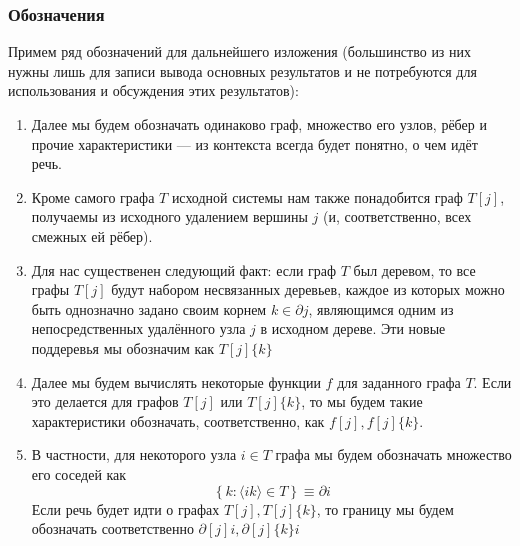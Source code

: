 \subsubsection{Обозначения}
Примем ряд обозначений для дальнейшего изложения (большинство из них нужны лишь для записи вывода основных результатов и не потребуются для использования и обсуждения этих результатов):
\begin{enumerate}
	\item Далее мы будем обозначать одинаково граф, множество его узлов, рёбер и прочие характеристики --- из контекста всегда будет понятно, о чем идёт речь. 
	
	\item Кроме самого графа $T$ исходной системы нам также понадобится граф $T[j]$, получаемы из исходного удалением вершины $j$ (и, соответственно, всех смежных ей рёбер).
	
	\item Для нас существенен следующий факт: если граф $T$ был деревом, то все графы $T[j]$ будут набором несвязанных деревьев, каждое из которых можно быть однозначно задано своим корнем $k \in \partial j$, являющимся одним из непосредственных удалённого узла $j$ в исходном дереве. Эти новые поддеревья мы обозначим как $T[j]\{k\}$
	
	\item Далее мы будем вычислять некоторые функции $f$ для заданного графа $T$. Если это делается для графов $T[j]$ или $T[j]\{k\}$, то мы будем такие характеристики обозначать, соответственно, как $f[j], f[j]\{k\}$.
	
	\item В частности, для некоторого узла $i \in T$ графа мы будем обозначать множество его соседей как
	$$
	\left\{ k : \langle ik \rangle \in T \right\} \equiv \partial i
	$$
	Если речь будет идти о графах $T[j],T[j]\{k\}$, то границу мы будем обозначать соответственно $\partial[j]i, \partial[j]\{k\}i$
		
\end{enumerate}

